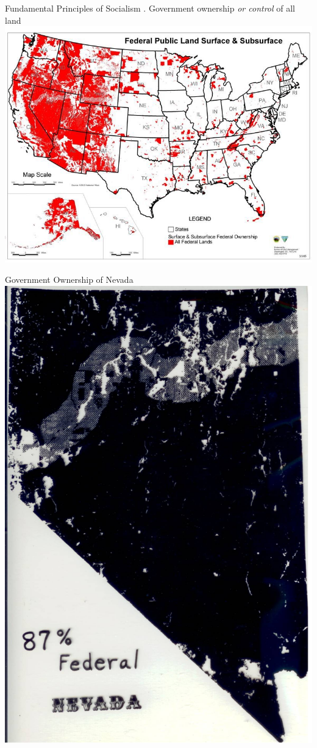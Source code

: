 \begin{frame}{Fundamental Principles of Socialism}
    . Government ownership \emph{or control} of all land \\
    \includegraphics[height=.9\textheight]{img/federal-lands.png} \\
\end{frame}

\begin{frame}{Government Ownership of Nevada}
    \centering
    \includegraphics[width=.9\textwidth]{img/nevada.jpg} \\
\end{frame}

